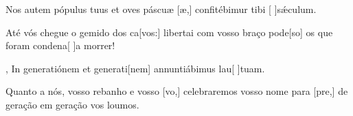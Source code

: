 {    {\item {}Nos autem pópulus tuus et oves páscuæ [æ,] confitébimur tibi [ ]{sǽ}culum.~\Responsorium}%
        {\item {}Até vós chegue o gemido dos ca[vos:] libertai com vosso braço pode[so] os que foram condena[ ]{a} morrer!~\Responsorium},
    {In generatiónem et generati[nem] annuntiábimus lau[ ]{tu}am.~\Responsorium}%
        {\item {}Quanto a nós, vosso rebanho e vosso [vo,] celebraremos vosso nome para [pre,] de geração em geração vos loumos.~\Responsorium}
}